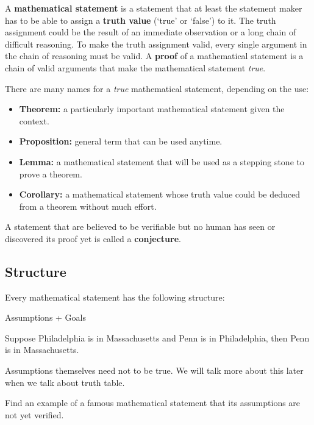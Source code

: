 A {\bf mathematical statement} is a statement that  
at least the statement maker has to be able
to assign a {\bf truth value} (`true' or `false') to it.
The truth assignment could be the result of an immediate observation or
a long chain of difficult reasoning.
To make the truth assignment valid, every single argument in the chain of reasoning
must be valid.
A {\bf proof} of a mathematical statement is a chain of valid arguments that make
the mathematical statement \emph{true}.

There are many names for a \emph{true} mathematical statement, depending on the use:
\begin{itemize}
    \item {\bf Theorem:} a particularly important mathematical statement 
        given the context.
    \item {\bf Proposition:} general term that can be used anytime.
    \item {\bf Lemma:} a mathematical statement that will be used as a stepping
        stone to prove a theorem.
    \item {\bf Corollary:} a mathematical statement whose truth value could be deduced
        from a theorem without much effort.
\end{itemize}

A statement that are believed to be verifiable but no human has seen or 
discovered its proof yet is called a {\bf conjecture}.

\subsection{Structure}
Every mathematical statement has the following structure:

\begin{center}
    Assumptions + Goals
\end{center}

\begin{example}
    Suppose Philadelphia is in Massachusetts and Penn is in Philadelphia, then Penn is in Massachusetts.
\end{example}

\begin{warning}
    Assumptions themselves need not to be true. 
    We will talk more about this later when we talk about truth table.
\end{warning}

\begin{exercise}
    Find an example of a famous mathematical statement  that its assumptions are not yet verified.
\end{exercise}

